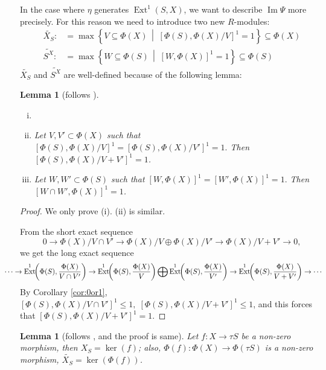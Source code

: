 \documentclass[reqno,11pt]{amsart}
\numberwithin{equation}{section}
\theoremstyle{plain}
\newtheorem{lemma}[theorem]{Lemma}
\theoremstyle{plain}
\numberwithin{equation}{section}
\theoremstyle{remark}
\DeclareMathOperator{\Img}{\operatorname{Im}}
\DeclareMathOperator{\Ext}{\operatorname{Ext}}
\begin{document}
In the case where $\eta$ generates $\Ext^1(S,X)$, we want to describe $\Img \Psi$ more precisely. For this reason we need to introduce two new $R$-modules:
	\begin{equation*}
	\begin{aligned}
	\widetilde{X_S}:&= \max \left\{ V \subseteq \Phi(X) \,\middle|\; [\Phi(S),\Phi(X)/V ]^1=1 \right\} \subseteq \Phi(X)\\
	\widetilde{S^X}:&= \max \left\{ W \subseteq \Phi(S) \,\middle|\; [W,\Phi(X)]^1=1 \right\} \subseteq \Phi(S)
	\end{aligned}
	\end{equation*}
$\widetilde{X_S}$ and $\widetilde{S^X}$ are well-defined because of the following lemma:
\begin{lemma}[follows {\cite[Lemma 27]{irelli2019cell}}]

\begin{enumerate}[(i)]
	\item[] 
	\item Let $V,V' \subset \Phi(X)$ such that $[\Phi(S),\Phi(X)/V ]^1=[\Phi(S),\Phi(X)/V']^1=1 .$ Then $[\Phi(S),\Phi(X)/V+V' ]^1=1$.
	\item  Let $W,W' \subset \Phi(S)$ such that $[W,\Phi(X)]^1=[W',\Phi(X)]^1=1 .$ Then $[W\cap W',\Phi(X)]^1=1$.
\end{enumerate}
\end{lemma}
\begin{proof}
We only prove (i). (ii) is similar.

From the short exact sequence 
$$0 \longrightarrow \Phi(X)/V\cap V' \longrightarrow \Phi(X)/V \oplus \Phi(X)/V' \longrightarrow \Phi(X)/V+V' \longrightarrow 0,$$
we get the long exact sequence
$$\hspace{-0.8cm}\cdots\rightarrow \Ext^1\!\!\left(\Phi(S),\frac{\Phi(X)}{V\cap V'}\right) \rightarrow \Ext^1\!\!\left(\Phi(S),\frac{\Phi(X)}{V}\right) \bigoplus \Ext^1\!\!\left(\Phi(S),\frac{\Phi(X)}{V'}\right) \rightarrow \Ext^1\!\!\left(\Phi(S),\frac{\Phi(X)}{V+ V'}\right) \rightarrow\cdots$$
By Corollary \ref{cor:0or1}, $[\Phi(S),\Phi(X)/V\cap V']^1\leqslant 1, \; [\Phi(S),\Phi(X)/V+V']^1\leqslant 1$, and this forces that $[\Phi(S),\Phi(X)/V+V']^1= 1$.
\end{proof}
\begin{lemma}[follows {\cite[Lemma 31(1)(2)]{irelli2019cell}}, and the proof is same]

Let $f:X \longrightarrow \tau S$ be a non-zero morphism, then $X_S=\ker (f)$; also, $\Phi(f): \Phi(X) \longrightarrow \Phi(\tau S)$ is a non-zero morphism, $\widetilde{X_S}=\ker (\Phi(f))$.
\end{lemma}
\end{document}
